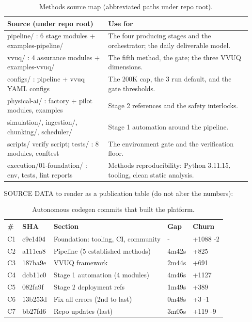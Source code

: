 \begin{table}[H]
\caption{Methods source map (abbreviated paths under repo root).}
\label{tab:methods_sources}
\centering
\begin{tabular}{L{4.6cm} L{8.8cm}}
\toprule
\textbf{Source (under repo root)} & \textbf{Use for} \\
\midrule
  pipeline/ : 6 stage modules + examples-pipeline/ & The four producing stages and the orchestrator; the daily deliverable model. \\
  vvuq/ : 4 assurance modules + examples-vvuq/ & The fifth method, the gate; the three VVUQ dimensions. \\
  configs/ : pipeline + vvuq YAML configs & The 200K cap, the 3 run default, and the gate thresholds. \\
  physical-ai/ : factory + pilot modules, examples & Stage 2 references and the safety interlocks. \\
  simulation/, ingestion/, chunking/, scheduler/ & Stage 1 automation around the pipeline. \\
  scripts/ verify script; tests/ : 8 modules, conftest & The environment gate and the verification floor. \\
  execution/01-foundation/ : env, tests, lint reports & Methods reproducibility: Python 3.11.15, tooling, clean static analysis. \\
\bottomrule
\end{tabular}
\end{table}

SOURCE DATA to render as a publication table (do not alter the numbers):

\begin{table}[H]
\caption{Autonomous codegen commits that built the platform.}
\label{tab:methods_codegen_commits}
\centering
\begin{tabular}{C{0.7cm} L{2.0cm} L{5.4cm} C{1.6cm} C{1.6cm}}
\toprule
\textbf{\#} & \textbf{SHA} & \textbf{Section} & \textbf{Gap} & \textbf{Churn} \\
\midrule
  C1 & c9e1404 & Foundation: tooling, CI, community & - & +1088 -2 \\
  C2 & a111ca8 & Pipeline (5 established methods) & 4m42s & +825 \\
  C3 & 187ba9e & VVUQ framework & 2m44s & +691 \\
  C4 & dcb11c0 & Stage 1 automation (4 modules) & 4m46s & +1127 \\
  C5 & 082fa9f & Stage 2 deployment refs & 1m49s & +389 \\
  C6 & 13b253d & Fix all errors (2nd to last) & 0m48s & +3 -1 \\
  C7 & bb27fd6 & Repo updates (last) & 3m05s & +119 -9 \\
\bottomrule
\end{tabular}
\end{table}

